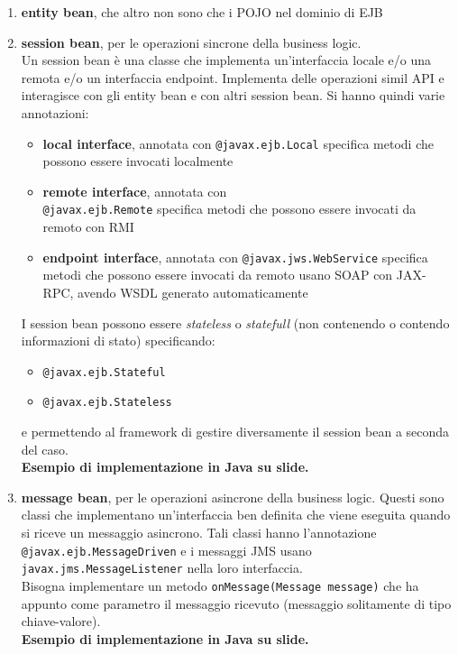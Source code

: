 \documentclass[a4paper,12pt, oneside]{book}
\begin{document}
\begin{enumerate}
  \item \textbf{entity bean}, che altro non sono che i POJO nel dominio di EJB
  \item \textbf{session bean}, per le operazioni sincrone della business
  logic.\\
  Un session bean è una classe che implementa un'interfaccia locale e/o una
  remota e/o un interfaccia endpoint. Implementa delle operazioni simil API e
  interagisce con gli entity bean e con altri session bean. Si hanno quindi
  varie annotazioni:
  \begin{itemize}
    \item \textbf{local interface}, annotata con \texttt{@javax.ejb.Local}
    specifica metodi che possono essere invocati localmente
    \item \textbf{remote interface}, annotata con\\ \texttt{@javax.ejb.Remote}
    specifica metodi che possono essere invocati da remoto con RMI
    \item \textbf{endpoint interface}, annotata con
    \texttt{@javax.jws.WebService} 
    specifica metodi che possono essere invocati da remoto usano SOAP con
    JAX-RPC, avendo WSDL generato automaticamente
  \end{itemize}
  I session bean possono essere \textit{stateless} o \textit{statefull}
  (non contenendo o contendo informazioni di stato)
  specificando:
  \begin{itemize}
    \item \texttt{@javax.ejb.Stateful}
    \item \texttt{@javax.ejb.Stateless}
  \end{itemize}
  e permettendo al framework di gestire diversamente il session bean a seconda
  del caso.\\
  \textbf{Esempio di implementazione in Java su slide.}
  \item \textbf{message bean}, per le operazioni asincrone della business
  logic. Questi sono classi che implementano un'interfaccia ben definita che
  viene eseguita quando si riceve un messaggio asincrono. Tali classi hanno
  l'annotazione 
  \texttt{@javax.ejb.MessageDriven} e i messaggi JMS usano
  \texttt{javax.jms.MessageListener} nella loro interfaccia.\\
  Bisogna implementare un metodo \texttt{onMessage(Message message)} che ha
  appunto come parametro il messaggio ricevuto (messaggio solitamente di tipo
  chiave-valore).\\ 
  \textbf{Esempio di implementazione in Java su slide.}
\end{enumerate}
\end{document}
